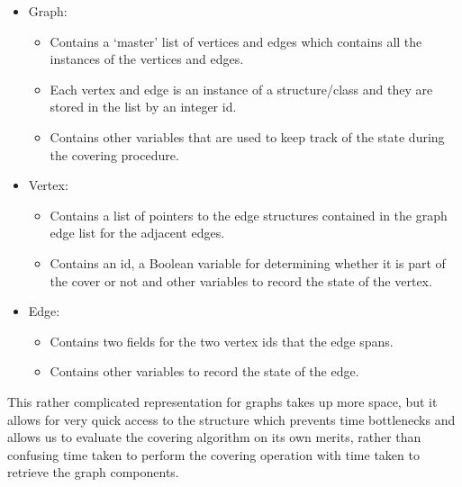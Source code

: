 \documentclass[11pt]{article}
\theoremstyle{definition}
\begin{document}
      \begin{itemize}
        \setlength{\itemsep}{1pt}
        \setlength{\parskip}{0pt}
        \setlength{\parsep}{0pt}
        \item Graph:
        \begin{itemize}
          \setlength{\itemsep}{1pt}
          \setlength{\parskip}{0pt}
          \setlength{\parsep}{0pt}
          \item Contains a `master' list of vertices and edges which contains all the instances of the vertices and edges.
          \item Each vertex and edge is an instance of a structure/class and they are stored in the list by an integer id.
          \item Contains other variables that are used to keep track of the state during the covering procedure.
        \end{itemize}
        \item Vertex:
        \begin{itemize}
          \setlength{\itemsep}{1pt}
          \setlength{\parskip}{0pt}
          \setlength{\parsep}{0pt}
          \item Contains a list of pointers to the edge structures contained in the graph edge list for the adjacent edges.
          \item Contains an id, a Boolean variable for determining whether it is part of the cover or not and other variables to record the state of the vertex. 
        \end{itemize}
        \item Edge:
        \begin{itemize}
          \setlength{\itemsep}{1pt}
          \setlength{\parskip}{0pt}
          \setlength{\parsep}{0pt}
          \item Contains two fields for the two vertex ids that the edge spans.
          \item Contains other variables to record the state of the edge.
        \end{itemize} 
      \end{itemize}

      This rather complicated representation for graphs takes up more space, but it allows for very quick access to the
      structure which prevents time bottlenecks and allows us to evaluate the covering algorithm on its own merits, rather
      than confusing time taken to perform the covering operation with time taken to retrieve the graph components.
      
\end{document}
